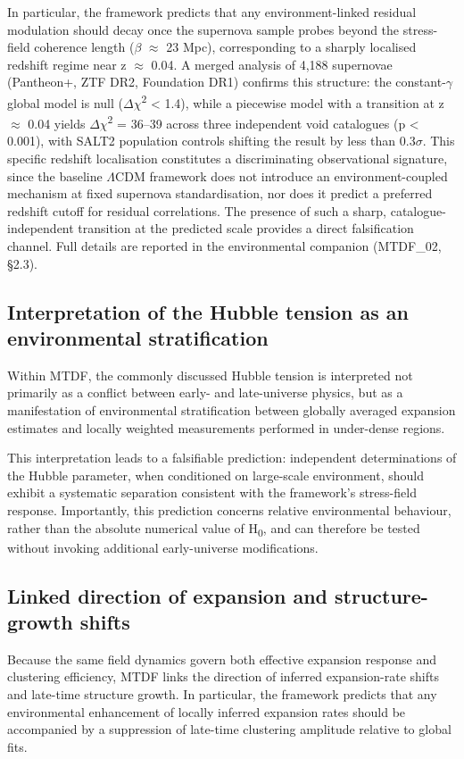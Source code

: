 \documentclass[11pt,a4paper]{article}
\begin{document}
In particular, the framework predicts that any environment-linked residual modulation should decay once the supernova sample probes beyond the stress-field coherence length ($\beta$ $\approx$ 23 Mpc), corresponding to a sharply localised redshift regime near z $\approx$ 0.04. A merged analysis of 4,188 supernovae (Pantheon+, ZTF DR2, Foundation DR1) confirms this structure: the constant-$\gamma$ global model is null ($\Delta$$\chi$\textsuperscript{2} < 1.4), while a piecewise model with a transition at z $\approx$ 0.04 yields $\Delta$$\chi$\textsuperscript{2} = 36--39 across three independent void catalogues (p < 0.001), with SALT2 population controls shifting the result by less than 0.3$\sigma$. This specific redshift localisation constitutes a discriminating observational signature, since the baseline $\Lambda$CDM framework does not introduce an environment-coupled mechanism at fixed supernova standardisation, nor does it predict a preferred redshift cutoff for residual correlations. The presence of such a sharp, catalogue-independent transition at the predicted scale provides a direct falsification channel. Full details are reported in the environmental companion (MTDF\_\allowbreak{}02, \S{}2.3).

\subsection{Interpretation of the Hubble tension as an environmental stratification}
Within MTDF, the commonly discussed Hubble tension is interpreted not primarily as a conflict between early- and late-universe physics, but as a manifestation of environmental stratification between globally averaged expansion estimates and locally weighted measurements performed in under-dense regions.

This interpretation leads to a falsifiable prediction: independent determinations of the Hubble parameter, when conditioned on large-scale environment, should exhibit a systematic separation consistent with the framework's stress-field response. Importantly, this prediction concerns relative environmental behaviour, rather than the absolute numerical value of H\textsubscript{0}, and can therefore be tested without invoking additional early-universe modifications.

\subsection{Linked direction of expansion and structure-growth shifts}
Because the same field dynamics govern both effective expansion response and clustering efficiency, MTDF links the direction of inferred expansion-rate shifts and late-time structure growth. In particular, the framework predicts that any environmental enhancement of locally inferred expansion rates should be accompanied by a suppression of late-time clustering amplitude relative to global fits.
\end{document}
